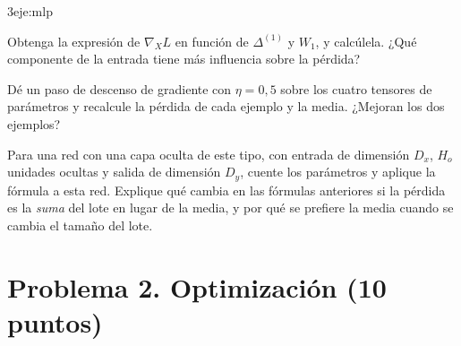 \begin{ejercicio}{3}{eje:mlp}
\begin{apartados}
  \item {} Obtenga la expresión de $\nabla_X L$ en función de $\Delta^{(1)}$ y $W_1$, y calcúlela. ¿Qué componente de la entrada tiene más influencia sobre la pérdida?
  \item {} Dé un paso de descenso de gradiente con $\eta=0{,}5$ sobre los cuatro tensores de parámetros y recalcule la pérdida de cada ejemplo y la media. ¿Mejoran los dos ejemplos?
  \item {} Para una red con una capa oculta de este tipo, con entrada de dimensión $D_x$, $H_o$ unidades ocultas y salida de dimensión $D_y$, cuente los parámetros y aplique la fórmula a esta red. Explique qué cambia en las fórmulas anteriores si la pérdida es la \emph{suma} del lote en lugar de la media, y por qué se prefiere la media cuando se cambia el tamaño del lote.
\end{apartados}
\end{ejercicio}

\section*{Problema 2. Optimización (10 puntos)}

